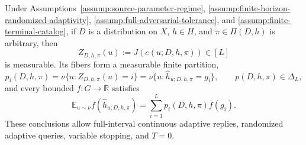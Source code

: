 \begin{lemma}
\label{lem:step-001-terminal-pushforward}
Under Assumptions~\ref{assump:source-parameter-regime},
\ref{assump:finite-horizon-randomized-adaptivity},
\ref{assump:full-adversarial-tolerance}, and
\ref{assump:finite-terminal-catalog}, if $D$ is a distribution on $X$,
$h\in H$, and $\pi\in\Pi(D,h)$ is arbitrary, then
\begin{equation}\label{eq:terminal-index}
Z_{D,h,\pi}(u):=J(e(u;D,h,\pi))\in[L]
\end{equation}
is measurable.  Its fibers form a measurable finite partition,
\[
p_i(D,h,\pi)
=\nu\{u:Z_{D,h,\pi}(u)=i\}
=\nu\{u:\widehat h_{u;D,h,\pi}=g_i\},
\qquad p(D,h,\pi)\in\Delta_L,
\]
and every bounded $f:G\to\mathbb R$ satisfies
\begin{equation}\label{eq:finite-pushforward}
\mathbb E_{u\sim\nu}f(\widehat h_{u;D,h,\pi})
=\sum_{i=1}^Lp_i(D,h,\pi)f(g_i).
\end{equation}
These conclusions allow full-interval continuous adaptive replies, randomized
adaptive queries, variable stopping, and $T=0$.
\end{lemma}

